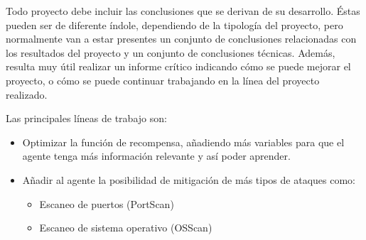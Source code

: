 
Todo proyecto debe incluir las conclusiones que se derivan de su desarrollo. Éstas pueden ser de diferente índole, dependiendo de la tipología del proyecto, pero normalmente van a estar presentes un conjunto de conclusiones relacionadas con los resultados del proyecto y un conjunto de conclusiones técnicas. 
Además, resulta muy útil realizar un informe crítico indicando cómo se puede mejorar el proyecto, o cómo se puede continuar trabajando en la línea del proyecto realizado. 

Las principales líneas de trabajo son:
\begin{itemize}
    \item Optimizar la función de recompensa, añadiendo más variables para que el agente tenga más información relevante y así poder aprender.
    \item Añadir al agente la posibilidad de mitigación de más tipos de ataques como:
    \begin{itemize}
        \item Escaneo de puertos (PortScan)
        \item Escaneo de sistema operativo (OSScan)
    \end{itemize}
\end{itemize}